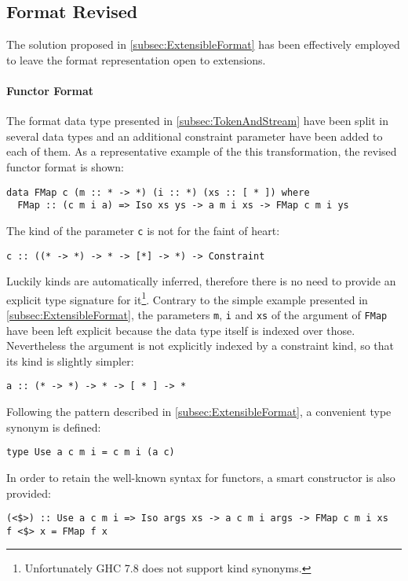\documentclass[../Thesis.tex]{subfiles}
\begin{document}
\subsection{Format Revised}
\label{subsec:FormatRevised}
The solution proposed in \ref{subsec:ExtensibleFormat} has been
effectively employed to leave the format representation open to
extensions.

\paragraph{Functor Format}
The format data type presented in \ref{subsec:TokenAndStream} have been 
split in several data types and an additional constraint parameter
have been added to each of them.
As a representative example of the this transformation, 
the revised functor format is shown:

\begin{verbatim}
data FMap c (m :: * -> *) (i :: *) (xs :: [ * ]) where
  FMap :: (c m i a) => Iso xs ys -> a m i xs -> FMap c m i ys
\end{verbatim}

The kind of the parameter \texttt{c} is not for the faint of heart:
\begin{center}
\texttt{c :: ((* -> *) -> * -> [*] -> *) -> Constraint} 
\end{center}
Luckily kinds are automatically inferred, therefore there is no need
to provide an explicit type signature for it\footnote{Unfortunately GHC 7.8 does not support kind synonyms.}.
Contrary to the simple example presented in \ref{subsec:ExtensibleFormat},
the parameters \texttt{m}, \texttt{i} and \texttt{xs} of the argument 
of \texttt{FMap} have been left explicit because the data type
itself is indexed over those.
Nevertheless the argument is not explicitly indexed by a constraint kind,
so that its kind is slightly simpler:

\begin{center}
\texttt{a :: (* -> *) -> * -> [ * ] -> *}
\end{center}

Following the pattern described in \ref{subsec:ExtensibleFormat},
a convenient type synonym is defined:
\begin{verbatim}
type Use a c m i = c m i (a c)
\end{verbatim}

In order to retain the well-known syntax for functors, a smart constructor
is also provided:
\begin{verbatim}
(<$>) :: Use a c m i => Iso args xs -> a c m i args -> FMap c m i xs
f <$> x = FMap f x
\end{verbatim}
\end{document}
